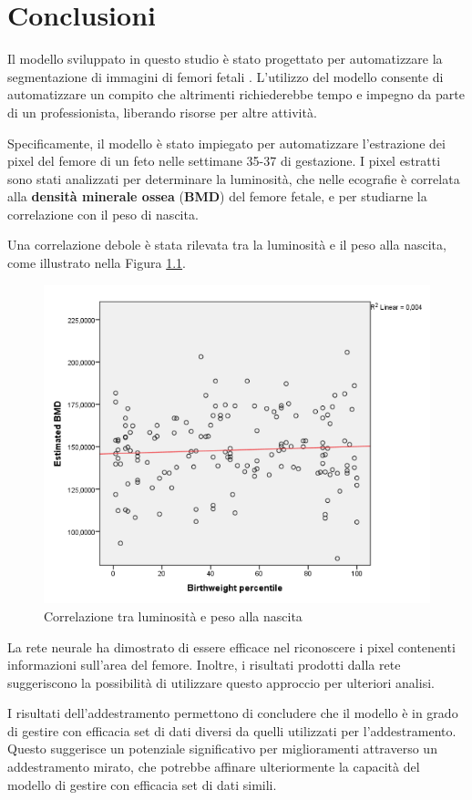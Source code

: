 \chapter{Conclusioni}
\label{chap:Conclusioni}

Il modello sviluppato in questo studio è stato progettato per automatizzare la segmentazione di
immagini di femori fetali \cite{abstract1} \cite{abstract2}. L'utilizzo del modello consente di
automatizzare un compito che altrimenti richiederebbe tempo e impegno da parte di un professionista,
liberando risorse per altre attività.

Specificamente, il modello è stato impiegato per automatizzare l'estrazione dei pixel del femore di
un feto nelle settimane 35-37 di gestazione. I pixel estratti sono stati analizzati per determinare
la luminosità, che nelle ecografie è correlata alla \textbf{densità minerale ossea} (\textbf{BMD})
del femore fetale, e per studiarne la correlazione con il peso di nascita.

Una correlazione debole è stata rilevata tra la luminosità e il peso alla nascita, come illustrato
nella Figura \ref{fig:correlazione tra luminosità e peso alla nascita}.

\begin{figure}[!ht]
	\centering
	\includegraphics[width=0.6\columnwidth]{Immagini/correlation_weight_abstract.png}
	\caption{Correlazione tra luminosità e peso alla nascita}
	\label{fig:correlazione tra luminosità e peso alla nascita}
\end{figure}

La rete neurale ha dimostrato di essere efficace nel riconoscere i pixel contenenti informazioni
sull'area del femore. Inoltre, i risultati prodotti dalla rete suggeriscono la possibilità di
utilizzare questo approccio per ulteriori analisi.


I risultati dell'addestramento permettono di concludere che il modello è in grado di gestire con
efficacia set di dati diversi da quelli utilizzati per l'addestramento. Questo suggerisce un
potenziale significativo per miglioramenti attraverso un addestramento mirato, che potrebbe affinare
ulteriormente la capacità del modello di gestire con efficacia set di dati simili.


